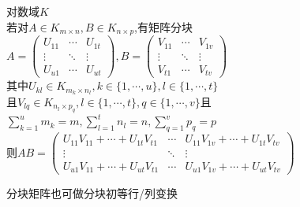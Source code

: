 \begin{dingli}
对数域$K$\\
若对$A\in K_{m\times n},B\in K_{n\times p}$,有矩阵分块$A=\begin{pmatrix}U_{11}&\cdots&U_{1t}\\ \vdots&\ddots&\vdots\\ U_{u1}&\cdots&U_{ut}\end{pmatrix},B=\begin{pmatrix}V_{11}&\cdots&V_{1v}\\ \vdots&\ddots&\vdots\\ V_{t1}&\cdots&V_{tv}\end{pmatrix}$\\
其中$U_{kl}\in K_{m_k\times n_l},k\in\{1,\cdots,u\},l\in \{1,\cdots,t\}$\\
且$V_{lq}\in K_{n_l\times p_q},l\in \{1,\cdots,t\},q\in \{1,\cdots,v\}$且$\sum\limits_{k=1}^{u}m_k=m,\sum\limits_{l=1}^{t}n_l=n,\sum\limits_{q=1}^{v}p_q=p$\\
则$AB=\begin{pmatrix}U_{11}V_{11}+\cdots+U_{1t}V_{t1}&\cdots&U_{11}V_{1v}+\cdots+U_{1t}V_{tv}\\ \vdots&\ddots&\vdots\\ U_{u1}V_{11}+\cdots+U_{ut}V_{t1}&\cdots&U_{u1}V_{1v}+\cdots+U_{ut}V_{tv}\end{pmatrix}$
\end{dingli}

\begin{zhu}
分块矩阵也可做分块初等行/列变换
\end{zhu}

